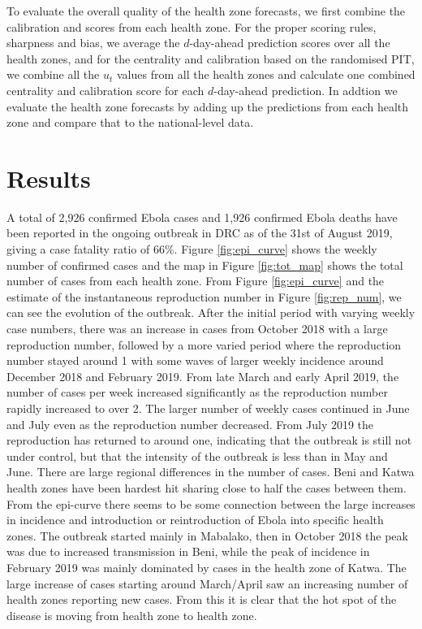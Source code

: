 \documentclass[12pt]{article}
\begin{document}
To evaluate the overall quality of the health zone forecasts, we first combine the calibration and scores from each health zone. For the proper scoring rules, sharpness and bias, we average the $d$-day-ahead prediction scores over all the health zones, and for the centrality and calibration based on the randomised PIT, we combine all the $u_t$ values from all the health zones and calculate one combined centrality and calibration score for each $d$-day-ahead prediction. In addtion we evaluate the health zone forecasts by adding up the predictions from each health zone and compare that to the national-level data.

\section{Results}

A total of 2,926 confirmed Ebola cases and 1,926 confirmed Ebola deaths have been reported in the ongoing outbreak in DRC as of the 31st of August 2019, giving a case fatality ratio of 66\%. Figure \ref{fig:epi_curve} shows the weekly number of confirmed cases and the map in Figure \ref{fig:tot_map} shows the total number of cases from each health zone. From Figure \ref{fig:epi_curve} and the estimate of the instantaneous reproduction number in Figure \ref{fig:rep_num}, we can see the evolution of the outbreak. After the initial period with varying weekly case numbers, there was an increase in cases from October 2018 with a large reproduction number, followed by a more varied period where the reproduction number stayed around 1 with some waves of larger weekly incidence around December 2018 and February 2019. From late March and early April 2019, the number of cases per week increased significantly as the reproduction number rapidly increased to over 2. The larger number of weekly cases continued in June and July even as the reproduction number decreased. From July 2019 the reproduction has returned to around one, indicating that the outbreak is still not under control, but that the intensity of the outbreak is less than in May and June. There are large regional differences in the number of cases. Beni and Katwa health zones have been hardest hit sharing close to half the cases between them. From the epi-curve there seems to be some connection between the large increases in incidence and introduction or reintroduction of Ebola into specific health zones. The outbreak started mainly in Mabalako, then in October 2018 the peak was due to increased transmission in Beni, while the peak of incidence in February 2019 was mainly dominated by cases in the health zone of Katwa. The large increase of cases starting around March/April saw an increasing number of health zones reporting new cases. From this it is clear that the hot spot of the disease is moving from health zone to health zone.
\end{document}
